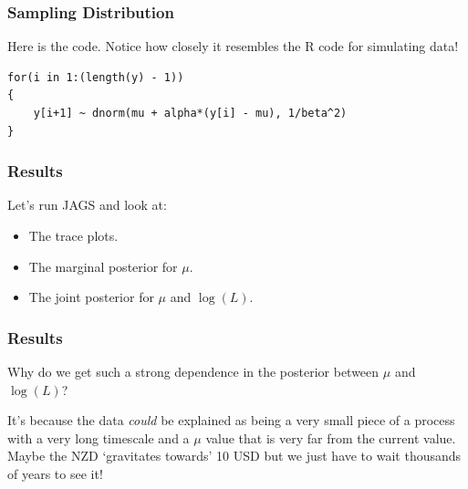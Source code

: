 \documentclass{beamer}
\begin{document}
\begin{frame}[fragile]
\frametitle{Sampling Distribution}
Here is the code. Notice how closely it resembles the R code for simulating
data!

\begin{verbatim}
for(i in 1:(length(y) - 1))
{
    y[i+1] ~ dnorm(mu + alpha*(y[i] - mu), 1/beta^2)
}
\end{verbatim}

\end{frame}

\begin{frame}[fragile]
\frametitle{Results}
Let's run JAGS and look at:

\begin{itemize}
\item The trace plots.\pause
\item The marginal posterior for $\mu$.\pause
\item The joint posterior for $\mu$ and $\log(L)$.
\end{itemize}

\end{frame}


\begin{frame}[fragile]
\frametitle{Results}
Why do we get such a strong dependence in the posterior between
$\mu$ and $\log(L)$?\\[0.5em]\pause

It's because the data {\em could} be explained as being a very small piece
of a process with a very long timescale and a $\mu$ value that is very far
from the current value. Maybe the NZD `gravitates towards' 10 USD but we
just have to wait thousands of years to see it!
\end{frame}
\end{document}
